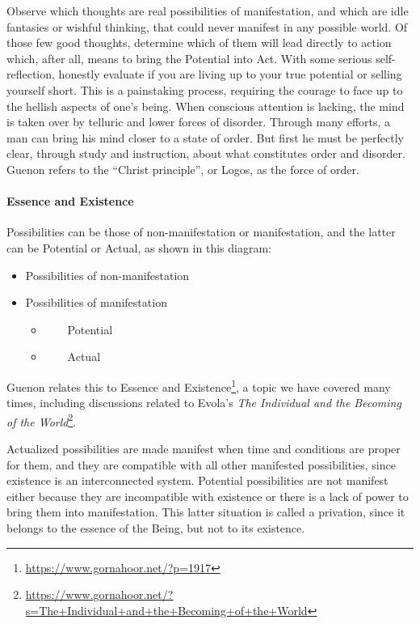 Observe which thoughts are real possibilities of manifestation, and which are idle fantasies or wishful thinking, that could never manifest in any possible world. Of those few good thoughts, determine which of them will lead directly to action which, after all, means to bring the Potential into Act. With some serious self-reflection, honestly evaluate if you are living up to your true potential or selling yourself short. This is a painstaking process, requiring the courage to face up to the hellish aspects of one's being. When conscious attention is lacking, the mind is taken over by telluric and lower forces of disorder. Through many efforts, a man can bring his mind closer to a state of order. But first he must be perfectly clear, through study and instruction, about what constitutes order and disorder. Guenon refers to the “Christ principle”, or Logos, as the force of order.

\paragraph{Essence and Existence}
Possibilities can be those of non-manifestation or manifestation, and the latter can be Potential or Actual, as shown in this diagram:

\begin{itemize}
\item Possibilities of non-manifestation 
\item Possibilities of manifestation 

\begin{itemize}
\item     Potential 
\item     Actual 
\end{itemize}
\end{itemize}
Guenon relates this to Essence and Existence\footnote{\url{https://www.gornahoor.net/?p=1917}}, a topic we have covered many times, including discussions related to Evola's \textit{The Individual and the Becoming of the World}\footnote{\url{https://www.gornahoor.net/?s=The+Individual+and+the+Becoming+of+the+World}}.

Actualized possibilities are made manifest when time and conditions are proper for them, and they are compatible with all other manifested possibilities, since existence is an interconnected system. Potential possibilities are not manifest either because they are incompatible with existence or there is a lack of power to bring them into manifestation. This latter situation is called a privation, since it belongs to the essence of the Being, but not to its existence.

